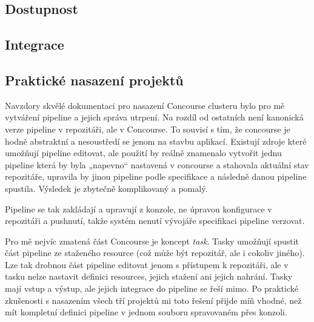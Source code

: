     \subsection{Dostupnost}
        \blind[3]

    \subsection{Integrace}
        \blind[1]
        \blind[1]
        \blind[1]

    \subsection{Praktické nasazení projektů}
        Navzdory skvělé dokumentaci pro nasazení Concourse clusteru bylo pro mě vytváření pipeline a jejich správa utrpení. Na rozdíl od ostatních \CI není kanonická verze pipeline v repozitáři, ale v Concourse. To souvisí s tím, že concourse je hodně abstraktní a nesoustředí se jenom na stavbu aplikací. Existují zdroje \cite{concourse-pipeline-res} které umožňují pipeline editovat, ale použití by reálně znamenalo vytvořit jednu pipeline která by byla „napevno“ nastavená v concourse a stahovala aktuální stav repozitáře, upravila by jinou pipeline podle specifikace a následně danou pipeline spustila. Výsledek je zbytečně komplikovaný a pomalý.

        Pipeline se tak zakládají a upravují z konzole, ne úpravou konfigurace v repozitáři a pushnutí, takže systém nenutí vývojáře specifikaci pipeline verzovat.

        Pro mě nejvíc zmatená část Concourse je koncept \textit{task}. Tasky umožňují spustit část pipeline ze staženého resource (což může být repozitář, ale i cokoliv jiného). Lze tak drobnou část pipeline editovat jenom s přístupem k repozitáři, ale v tasku nelze nastavit definici resources, jejich stažení ani jejich nahrání. Tasky mají vstup a výstup, ale jejich integrace do pipeline se řeší mimo. Po praktické zkušenosti s nasazením všech tří projektů mi toto řešení přijde míň vhodné, než mít kompletní definici pipeline v jednom souboru spravovaném přes konzoli.

